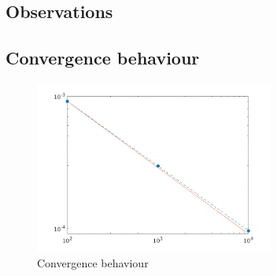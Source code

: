 \documentclass[../main/main.tex]{subfiles}
\begin{document}
\newpage
\subsection{Observations}


\newpage
\subsection{Convergence behaviour}
\begin{figure}[!htp]
\centering
\includegraphics[width=0.7\textwidth]{../../two_resonance_lines/figures/convergence_one_line.png}
\caption{Convergence behaviour}
\label{convergence_one_line}
\end{figure}

\newpage
\end{document}
